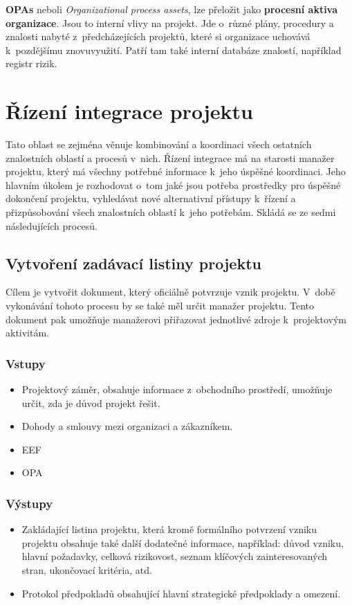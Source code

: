 \textbf{OPAs} neboli \textit{Organizational process assets}, lze přeložit jako \textbf{procesní aktiva organizace}. Jsou to interní vlivy na projekt. Jde o~různé plány, procedury a znalosti nabyté z~předcházejících projektů, které si organizace uchovává k~pozdějšímu znovuvyužití. Patří tam také interní databáze znalostí, například registr rizik.

\section{Řízení integrace projektu}
\label{RizeniIntegrace}
Tato oblast se zejména věnuje kombinování a koordinaci všech ostatních znalostních oblastí a procesů v~nich. Řízení integrace má na starosti manažer projektu, který má všechny potřebné informace k~jeho úspěšné koordinaci. Jeho hlavním úkolem je rozhodovat o~tom jaké jsou potřeba prostředky pro úspěšné dokončení projektu, vyhledávat nové alternativní přístupy k~řízení a přizpůsobování všech znalostních oblastí k~jeho potřebám. Skládá se ze sedmi následujících procesů.

\subsection*{Vytvoření zadávací listiny projektu}

Cílem je vytvořit dokument, který oficiálně potvrzuje vznik projektu. V~době vykonávání tohoto procesu by se také měl určit manažer projektu. Tento dokument pak umožňuje manažerovi přiřazovat jednotlivé zdroje k~projektovým aktivitám.

\subsubsection*{Vstupy}
\begin{itemize}
    \item Projektový záměr, obsahuje informace z~obchodního prostředí, umožňuje určit, zda je důvod projekt řešit.
    \item Dohody a smlouvy mezi organizaci a zákazníkem.
    \item EEF
    \item OPA
\end{itemize}
\subsubsection*{Výstupy}
\begin{itemize}
    \item Zakládající listina projektu, která kromě formálního potvrzení vzniku projektu obsahuje také další dodatečné informace, například: důvod vzniku, hlavní požadavky, celková rizikovost, seznam klíčových zainteresovaných stran, ukončovací kritéria, atd.
    \item Protokol předpokladů obsahující hlavní strategické předpoklady a omezení.
\end{itemize}

